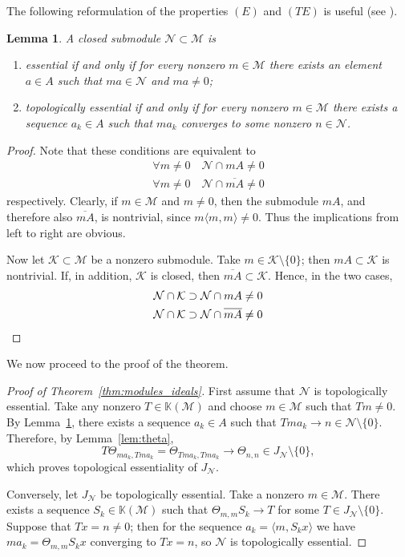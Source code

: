 \documentclass[reqno,a4paper,12pt]{amsart}
\theoremstyle{plain}
\newtheorem{lemma}[theorem]{Lemma}
\theoremstyle{definition}
\newcommand{\inner}[2]{\langle #1, #2 \rangle}
\newcommand{\KK}{\mathbb K}
\newcommand{\M}{\mathcal M}
\newcommand{\N}{\mathcal N}
\begin{document}
	The following reformulation of the properties $(E)$ and $(TE)$ is useful (see \cite{manuilov}).
	\begin{lemma}
		\label{lem:reformulation}
		A closed submodule $\N \subset \M$ is
		\begin{enumerate}
			\item[(1)] essential if and only if for every nonzero $m \in \M$ there exists an element $a \in A$ such that $ma \in \N$ and $ma \ne 0$;
			\item[(2)] topologically essential if and only if for every nonzero $m \in \M$ there exists a sequence $a_k \in A$ such that $ma_k$ converges to some nonzero $n \in \N$.
		\end{enumerate}
	\end{lemma}
	\begin{proof}
		Note that these conditions are equivalent to
		\begin{align}
			\forall m \ne 0\quad \N \cap mA \ne 0 \\
			\forall m \ne 0\quad \N \cap \overline{mA} \ne 0
		\end{align}
		respectively.
		Clearly, if $m \in \M$ and $m \ne 0$, then the submodule $mA$, and therefore also $\overline{mA}$, is nontrivial, since $m\inner{m}{m} \ne 0$.
		Thus the implications from left to right are obvious.
		
		Now let $\mathcal K \subset \M$ be a nonzero submodule.
		Take $m \in \mathcal K \setminus \{0\}$; then $mA \subset \mathcal K$ is nontrivial.
		If, in addition, $\mathcal K$ is closed, then $\overline{mA} \subset \mathcal K$. Hence, in the two cases,
		\begin{gather*}
			\N \cap \mathcal K \supset \N \cap mA \ne 0 \\
			\N \cap \mathcal K \supset \N \cap \overline{mA} \ne 0 \hfill \qedhere
		\end{gather*}
	\end{proof}
	We now proceed to the proof of the theorem.
	\begin{proof}[Proof of Theorem~\ref{thm:modules_ideals}]
		First assume that $\N$ is topologically essential.
		Take any nonzero $T \in \KK(\M)$ and choose $m \in \M$ such that $Tm \ne 0$.
		By Lemma~\ref{lem:reformulation}, there exists a sequence $a_k \in A$ such that $Tma_k \to n \in \N \setminus \{0\}$.
		Therefore, by Lemma~\ref{lem:theta},
		\[
		T\Theta_{ma_k,Tma_k} = \Theta_{Tma_k,Tma_k} \to \Theta_{n,n} \in J_\N \setminus \{0\},
		\]
		which proves topological essentiality of $J_\N$.
		
		Conversely, let $J_\N$ be topologically essential. Take a nonzero $m \in \M$.
		There exists a sequence $S_k \in \KK(\M)$ such that $\Theta_{m,m}S_k\rightarrow T$ for some $T\in J_\N \setminus \{0\}$.
		Suppose that $Tx = n \ne 0$; then for the sequence $a_k = \inner{m}{S_kx}$ we have $ma_k = \Theta_{m,m}S_kx$ converging to $Tx = n$, so $\N$ is topologically essential.
	\end{proof}
	
\end{document}
